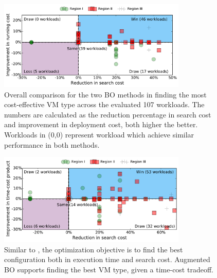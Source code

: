 \begin{figure}[!htbp]
    \centering
    \includegraphics[width=0.8\textwidth]{figures/comparison_cost.pdf}
    \caption{Overall comparison for the two BO methods in finding the most cost-effective VM type across the evaluated 107 workloads. The numbers are calculated as the reduction percentage in search cost and improvement in deployment cost, both higher the better. Workloads in (0,0) represent workload which achieve similar performance in both methods.}
    \label{fig:comparison_cost}
\end{figure}

\begin{figure}[!htbp]
    \centering
    \includegraphics[width=0.8\textwidth]{figures/comparison_cdp_1.05.pdf}
    \caption{Similar to \myfigure{\ref{fig:comparison_cost}}, the optimization objective is to find the best configuration both in execution time and search cost. Augmented BO supports finding the best VM type, given a time-cost tradeoff.}
    \label{fig:comparison_cdp_1.05}
\end{figure}
